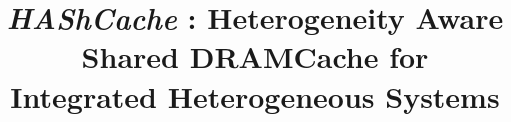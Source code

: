 \documentclass[pageno]{jpaper}
\newcommand{\cachename}{\textit{HAShCache }}
\begin{document}
\title{\textit{\cachename}: Heterogeneity Aware Shared DRAMCache for Integrated Heterogeneous Systems}

\date{}
\maketitle

\thispagestyle{empty}




















\end{document}
